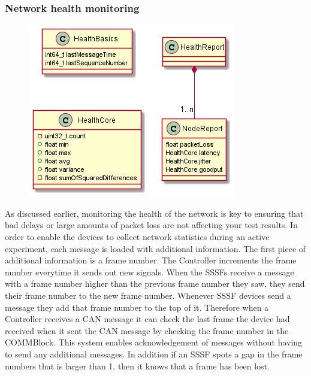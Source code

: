 \documentclass[letterpaper,twocolumn,12pt]{article}
\begin{document}
\subsubsection{Network health monitoring}\label{sec:nethealth}
\begin{figure}[t!]
    \centering
    \includegraphics[width=\linewidth]{out/images/network_health/network_health.png}
    \caption{}
    \label{fig:}
\end{figure}
As discussed earlier, monitoring the health of the network is key to ensuring that bad delays or large amounts of packet loss are not affecting your test results. In order to enable the devices to collect network statistics during an active experiment, each message is loaded with additional information. The first piece of additional information is a frame number. The Controller increments the frame number everytime it sends out new signals. When the SSSFs receive a message with a frame number higher than the previous frame number they saw, they send their frame number to the new frame number. Whenever SSSF devices send a message they add that frame number to the top of it. Therefore when a Controller receives a CAN message it can check the last frame the device had received when it sent the CAN message by checking the frame number in the COMMBlock. This system enables acknowledgement of messages without having to send any additional messages. In addition if an SSSF spots a gap in the frame numbers that is larger than 1, then it knows that a frame has been lost.
\end{document}
